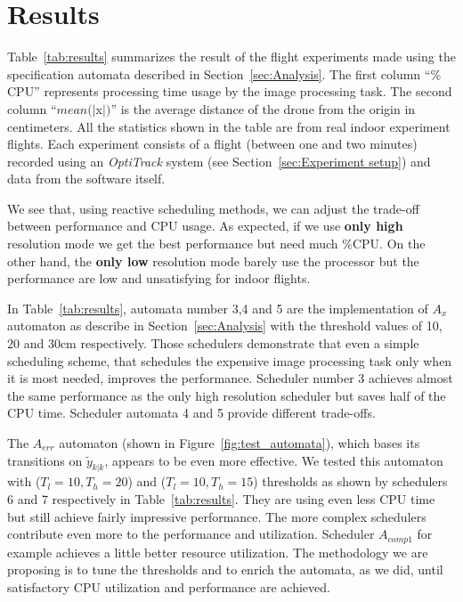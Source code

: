 \documentclass[ twoside, 12pt ]{article}
\begin{document}
\section{Results}
\label{sec:results}

Table~\ref{tab:results} summarizes the result of the flight experiments made using the specification automata described in Section~\ref{sec:Analysis}.
The first column ``\% CPU'' represents processing time usage by the image processing task.
The second column ``$mean(|$x$|)$'' is the average distance of the drone from the origin in centimeters.
All the statistics shown in the table are from real indoor experiment flights. Each experiment consists of a flight (between one and two minutes) recorded using an \textit{OptiTrack} system (see Section~\ref{sec:Experiment setup}) and data from the software itself.

We see that, using reactive scheduling methods, we can adjust the trade-off between performance and CPU usage. As expected, if we use \textbf{only high} resolution mode we get the best performance but need much \%CPU. On the other hand, the \textbf{only low} resolution mode barely use the processor but the performance are low and unsatisfying for indoor flights.

In Table~\ref{tab:results}, automata number 3,4 and 5 are the implementation of $A_{x}$ automaton as describe in Section~\ref{sec:Analysis} with the threshold values of 10, 20 and 30cm respectively.
Those schedulers demonstrate that even a simple scheduling scheme, that schedules the expensive image processing task only when it is most needed, improves the performance. Scheduler number 3 achieves almost the same performance as the only high resolution scheduler but saves half of the CPU time. Scheduler automata 4 and 5 provide different trade-offs.

The $A_{err}$ automaton (shown in Figure~\ref{fig:test_automata}), which bases its transitions on $\tilde{y}_{k|k}$, appears to be even more effective.
We tested this automaton with ($T_l=10 , T_h=20$) and ($T_l=10 , T_h=15$) thresholds as shown by schedulers 6 and 7 respectively in Table~\ref{tab:results}.
They are using even less CPU time but still achieve fairly impressive performance.
The more complex schedulers contribute even more to the performance and utilization. Scheduler $A_{comp1}$ for example achieves a little better resource utilization.
The methodology we are proposing is to tune the thresholds and to enrich the automata, as we did, until satisfactory CPU utilization and performance are achieved.
\end{document}
